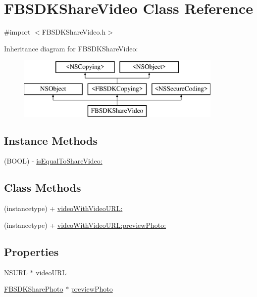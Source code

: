 \hypertarget{interface_f_b_s_d_k_share_video}{}\section{F\+B\+S\+D\+K\+Share\+Video Class Reference}
\label{interface_f_b_s_d_k_share_video}


{\ttfamily \#import $<$F\+B\+S\+D\+K\+Share\+Video.\+h$>$}

Inheritance diagram for F\+B\+S\+D\+K\+Share\+Video\+:\begin{figure}[H]
\begin{center}
\leavevmode
\includegraphics[height=3.000000cm]{interface_f_b_s_d_k_share_video}
\end{center}
\end{figure}
\subsection*{Instance Methods}
\begin{DoxyCompactItemize}
\item 
(B\+O\+O\+L) -\/ \hyperlink{interface_f_b_s_d_k_share_video_aa328b40045977254ccd5d3c022f2c4eb}{is\+Equal\+To\+Share\+Video\+:}
\end{DoxyCompactItemize}
\subsection*{Class Methods}
\begin{DoxyCompactItemize}
\item 
(instancetype) + \hyperlink{interface_f_b_s_d_k_share_video_ac6de38c3ee95b53f9cc0062e7f784923}{video\+With\+Video\+U\+R\+L\+:}
\item 
(instancetype) + \hyperlink{interface_f_b_s_d_k_share_video_a2bd0d7bb0071c661a7508d6111aea9b8}{video\+With\+Video\+U\+R\+L\+:preview\+Photo\+:}
\end{DoxyCompactItemize}
\subsection*{Properties}
\begin{DoxyCompactItemize}
\item 
N\+S\+U\+R\+L $\ast$ \hyperlink{interface_f_b_s_d_k_share_video_afdccd7554a53514993ba881300edecc5}{video\+U\+R\+L}
\item 
\hyperlink{interface_f_b_s_d_k_share_photo}{F\+B\+S\+D\+K\+Share\+Photo} $\ast$ \hyperlink{interface_f_b_s_d_k_share_video_a7f5d79a8e18478aa5a5b385dbe81c036}{preview\+Photo}
\end{DoxyCompactItemize}


